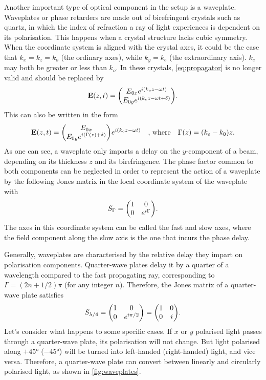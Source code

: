 Another important type of optical component in the setup is a waveplate. Waveplates or phase retarders are made out of birefringent crystals such as quartz, in which the index of refraction a ray of light experiences is dependent on its polarisation. This happens when a crystal structure lacks cubic symmetry. When the coordinate system is aligned with the crystal axes, it could be the case that $ k_x = k_z = k_o $ (the ordinary axes), while $ k_y = k_e $ (the extraordinary axis). $ k_e $ may both be greater or less than $ k_o $. In these crystals, \autoref{eq:propagator} is no longer valid and should be replaced by
\begin{equation}
	\vb{E}(z, t) = \mqty(\Eox e^{i(k_o z-\omega t)} \\ \Eoy e^{i(k_e z-\omega t + \delta)} ).
\end{equation}
This can also be written in the form
\begin{equation}
	\vb{E}(z, t) = \mqty(\Eox  \\ \Eoy e^{i(\Gamma(z) + \delta)} ) e^{i(k_o z-\omega t)}
	\qq{, where}
	\Gamma(z) = (k_e-k_0) z.
\end{equation}
As one can see, a waveplate only imparts a delay on the $ y $-component of a beam, depending on its thickness $ z $ and its birefringence. The phase factor common to both components can be neglected in order to represent the action of a waveplate by the following Jones matrix in the local coordinate system of the waveplate with
\begin{equation}
	S_\Gamma = \mqty(1 & 0 \\ 0 & e^{i\Gamma}).
\end{equation}
The axes in this coordinate system can be called the fast and slow axes, where the field component along the slow axis is the one that incurs the phase delay.

Generally, waveplates are characterised by the relative delay they impart on polarisation components. Quarter-wave plates delay it by a quarter of a wavelength compared to the fast propagating ray, corresponding to $ \Gamma = (2n + 1/2)\pi$ (for any integer $ n $). Therefore, the Jones matrix of a quarter-wave plate satisfies 
\begin{equation}
	S_\qwp = \mqty(1 & 0 \\ 0 & e^{i\pi/2}) = \mqty(1 & 0 \\ 0 & i).
\end{equation}
Let's consider what happens to some specific cases. If $ x $ or $ y $ polarised light passes through a quarter-wave plate, its polarisation will not change. But light polarised along $ +\ang{45} $ ($ -\ang{45} $) will be turned into left-handed (right-handed) light, and vice versa. Therefore, a quarter-wave plate can convert between linearly and circularly polarised light, as shown in \autoref{fig:waveplates}.

